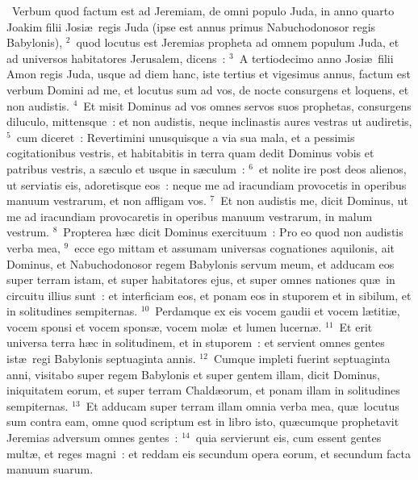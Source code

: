 ~\lettrine[lines=10,image=true,loversize=0.05,lraise=-0.03]{V}{}erbum quod factum est ad Jeremiam, de omni populo Juda, in anno quarto Joakim filii Josi\ae\ regis Juda (ipse est annus primus Nabuchodonosor regis Babylonis),
${}^{2}$~quod locutus est Jeremias propheta ad omnem populum Juda, et ad universos habitatores Jerusalem, dicens~:
${}^{3}$~A tertiodecimo anno Josi\ae\ filii Amon regis Juda, usque ad diem hanc, iste tertius et vigesimus annus, factum est verbum Domini ad me, et locutus sum ad vos, de nocte consurgens et loquens, et non audistis.
${}^{4}$~Et misit Dominus ad vos omnes servos suos prophetas, consurgens diluculo, mittensque~: et non audistis, neque inclinastis aures vestras ut audiretis,
${}^{5}$~cum diceret~: Revertimini unusquisque a via sua mala, et a pessimis cogitationibus vestris, et habitabitis in terra quam dedit Dominus vobis et patribus vestris, a s\ae culo et usque in s\ae culum~:
${}^{6}$~et nolite ire post deos alienos, ut serviatis eis, adoretisque eos~: neque me ad iracundiam provocetis in operibus manuum vestrarum, et non affligam vos.
${}^{7}$~Et non audistis me, dicit Dominus, ut me ad iracundiam provocaretis in operibus manuum vestrarum, in malum vestrum.
${}^{8}$~Propterea h\ae c dicit Dominus exercituum~: Pro eo quod non audistis verba mea,
${}^{9}$~ecce ego mittam et assumam universas cognationes aquilonis, ait Dominus, et Nabuchodonosor regem Babylonis servum meum, et adducam eos super terram istam, et super habitatores ejus, et super omnes nationes qu\ae\ in circuitu illius sunt~: et interficiam eos, et ponam eos in stuporem et in sibilum, et in solitudines sempiternas.
${}^{10}$~Perdamque ex eis vocem gaudii et vocem l\ae titi\ae , vocem sponsi et vocem spons\ae , vocem mol\ae\ et lumen lucern\ae .
${}^{11}$~Et erit universa terra h\ae c in solitudinem, et in stuporem~: et servient omnes gentes ist\ae\ regi Babylonis septuaginta annis.
${}^{12}$~Cumque impleti fuerint septuaginta anni, visitabo super regem Babylonis et super gentem illam, dicit Dominus, iniquitatem eorum, et super terram Chald\ae orum, et ponam illam in solitudines sempiternas.
${}^{13}$~Et adducam super terram illam omnia verba mea, qu\ae\ locutus sum contra eam, omne quod scriptum est in libro isto, qu\ae cumque prophetavit Jeremias adversum omnes gentes~:
${}^{14}$~quia servierunt eis, cum essent gentes mult\ae , et reges magni~: et reddam eis secundum opera eorum, et secundum facta manuum suarum.



